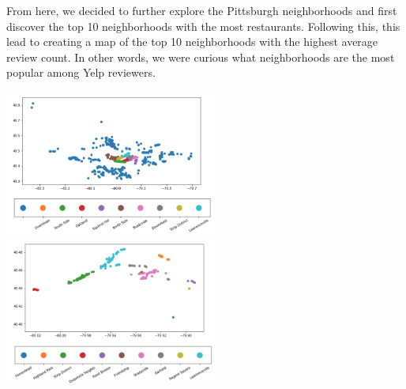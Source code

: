 \documentclass{neu_handout}
\begin{document}
From here, we decided to further explore the Pittsburgh neighborhoods and first discover the top 10 neighborhoods with the most restaurants. Following this, this lead to creating a map of the top 10 neighborhoods with the highest average review count. In other words, we were curious what neighborhoods are the most popular among Yelp reviewers.

\begin{center}
\includegraphics[width=70mm,scale=0.5]{pitts_hoods_most_restaurants}
\includegraphics[width=70mm,scale=0.5]{top_10_most_popular_neighborhoods}
\end{center}
\end{document}
